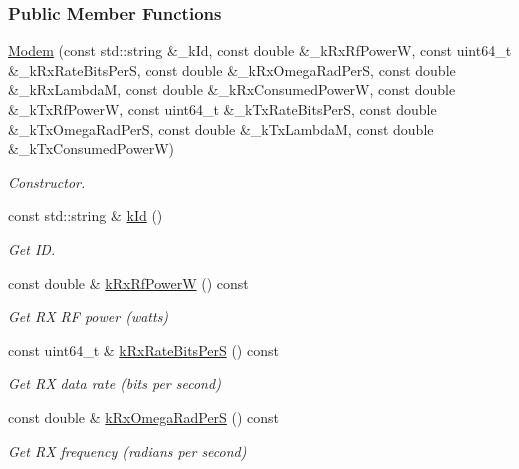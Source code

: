\subsubsection*{Public Member Functions}
\begin{DoxyCompactItemize}
\item 
\hyperlink{classosse_1_1collaborate_1_1_modem_ade030a147d5bc9aaf4a0b615c1cea84a}{Modem} (const std\+::string \&\+\_\+k\+Id, const double \&\+\_\+k\+Rx\+Rf\+PowerW, const uint64\+\_\+t \&\+\_\+k\+Rx\+Rate\+Bits\+PerS, const double \&\+\_\+k\+Rx\+Omega\+Rad\+PerS, const double \&\+\_\+k\+Rx\+LambdaM, const double \&\+\_\+k\+Rx\+Consumed\+PowerW, const double \&\+\_\+k\+Tx\+Rf\+PowerW, const uint64\+\_\+t \&\+\_\+k\+Tx\+Rate\+Bits\+PerS, const double \&\+\_\+k\+Tx\+Omega\+Rad\+PerS, const double \&\+\_\+k\+Tx\+LambdaM, const double \&\+\_\+k\+Tx\+Consumed\+PowerW)
\begin{DoxyCompactList}\small\item\em Constructor. \end{DoxyCompactList}\item 
const std\+::string \& \hyperlink{classosse_1_1collaborate_1_1_modem_a8cc084d7cc349b4029f1281c5d3248a3}{k\+Id} ()
\begin{DoxyCompactList}\small\item\em Get ID. \end{DoxyCompactList}\item 
const double \& \hyperlink{classosse_1_1collaborate_1_1_modem_ad37beed0399591a98a47b62966a7c2c0}{k\+Rx\+Rf\+PowerW} () const
\begin{DoxyCompactList}\small\item\em Get RX RF power (watts) \end{DoxyCompactList}\item 
const uint64\+\_\+t \& \hyperlink{classosse_1_1collaborate_1_1_modem_a899a9e97b55878e6b521038ddb2a9548}{k\+Rx\+Rate\+Bits\+PerS} () const
\begin{DoxyCompactList}\small\item\em Get RX data rate (bits per second) \end{DoxyCompactList}\item 
const double \& \hyperlink{classosse_1_1collaborate_1_1_modem_ac20ca2074113d6e21c8351c22f821bf2}{k\+Rx\+Omega\+Rad\+PerS} () const
\begin{DoxyCompactList}\small\item\em Get RX frequency (radians per second) \end{DoxyCompactList}\item 

\end{DoxyCompactItemize}
